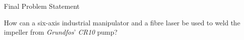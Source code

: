 
\begin{frame}{Final Problem Statement}
\begin{center}
How can a six-axis industrial manipulator and a fibre laser be used to weld the impeller from \textit{Grundfos}' \textit{CR10} pump?
\end{center}
\end{frame}